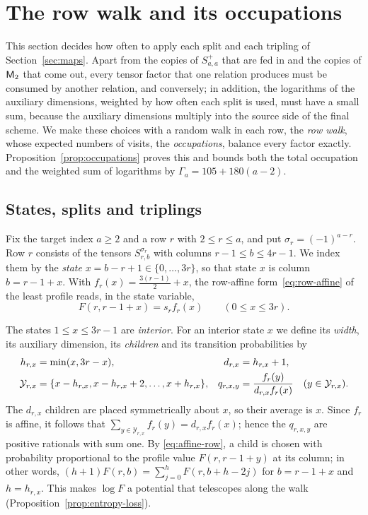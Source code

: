 \section{The row walk and its occupations}
\label{sec:flows}

This section decides how often to apply each split and each tripling of
Section~\ref{sec:maps}. Apart from the copies of \(S^+_{a,a}\) that are
fed in and the copies of \(\mathsf M_2\) that come out, every tensor factor that
one relation produces must be consumed by another relation, and
conversely; in addition, the logarithms of the auxiliary dimensions,
weighted by how often each split is used, must have a small sum, because
the auxiliary dimensions multiply into the source side of the final
scheme. We make these choices with a random walk in each row, the
\emph{row walk}, whose expected numbers of visits, the
\emph{occupations}, balance every factor exactly.
Proposition~\ref{prop:occupations} proves this and bounds both the total
occupation and the weighted sum of logarithms by
\(\Gamma_a=105+180(a-2)\).

\subsection{States, splits and triplings}
\label{subsec:row-walk}

Fix the target index \(a\ge2\) and a row \(r\) with \(2\le r\le a\), and
put \(\sigma_r=(-1)^{a-r}\). Row \(r\) consists of the tensors
\(S^{\sigma_r}_{r,b}\) with columns \(r-1\le b\le4r-1\). We index them by
the \emph{state} \(x=b-r+1\in\{0,\ldots,3r\}\), so that state \(x\) is
column \(b=r-1+x\). With \(f_r(x)=\frac{3(r-1)}2+x\), the row-affine
form~\eqref{eq:row-affine} of the least profile reads, in the state
variable,
\begin{equation}\label{eq:affine-row}
 F(r,r-1+x)=s_rf_r(x)\qquad(0\le x\le3r).
\end{equation}

The states \(1\le x\le3r-1\) are \emph{interior}. For an interior state
\(x\) we define its \emph{width}, its auxiliary dimension, its
\emph{children} and its transition probabilities by
\begin{align}
 h_{r,x}&=\min(x,3r-x),&d_{r,x}&=h_{r,x}+1,\notag\\
 \mathcal Y_{r,x}&=\{x-h_{r,x},x-h_{r,x}+2,\ldots,x+h_{r,x}\},
 &q_{r,x,y}&=\frac{f_r(y)}{d_{r,x}f_r(x)}
 \quad(y\in\mathcal Y_{r,x}).\label{eq:multiway-probabilities}
\end{align}
The \(d_{r,x}\) children are placed symmetrically about \(x\), so their
average is \(x\). Since \(f_r\) is affine, it follows that
\(\sum_{y\in\mathcal Y_{r,x}}f_r(y)=d_{r,x}f_r(x)\); hence the
\(q_{r,x,y}\) are positive rationals with sum one. By
\eqref{eq:affine-row}, a child is chosen with probability proportional to
the profile value \(F(r,r-1+y)\) at its column; in other words,
\((h+1)F(r,b)=\sum_{j=0}^hF(r,b+h-2j)\) for \(b=r-1+x\) and
\(h=h_{r,x}\). This makes \(\log F\) a potential that telescopes along
the walk (Proposition~\ref{prop:entropy-loss}).

